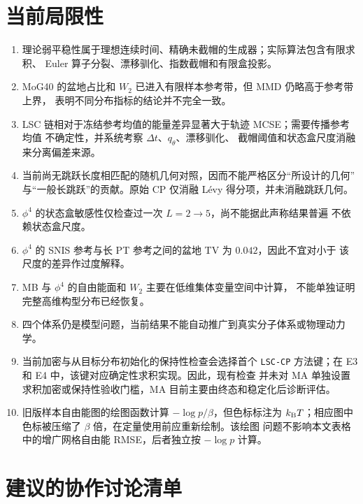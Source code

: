\documentclass[11pt,a4paper]{article}
\begin{document}
\section{当前局限性}

\begin{enumerate}
 \item 理论弱平稳性属于理想连续时间、精确未截帽的生成器；实际算法包含有限求积、
 Euler 算子分裂、漂移驯化、指数截帽和有限盒投影。
 \item MoG40 的盆地占比和 $W_2$ 已进入有限样本参考带，但 MMD 仍略高于参考带上界，
 表明不同分布指标的结论并不完全一致。
 \item LSC 链相对于冻结参考均值的能量差异显著大于轨迹 MCSE；需要传播参考均值
 不确定性，并系统考察 $\Delta t$、$q_\theta$、漂移驯化、
 截帽阈值和状态盒尺度消融来分离偏差来源。
 \item 当前尚无跳跃长度相匹配的随机几何对照，因而不能严格区分“所设计的几何”
 与“一般长跳跃”的贡献。原始 CP 仅消融 Lévy 得分项，并未消融跳跃几何。
 \item $\phi^4$ 的状态盒敏感性仅检查过一次 $L=2\to5$，尚不能据此声称结果普遍
 不依赖状态盒尺度。
 \item $\phi^4$ 的 SNIS 参考与长 PT 参考之间的盆地 TV 为 $0.042$，因此不宜对小于
 该尺度的差异作过度解释。
 \item MB 与 $\phi^4$ 的自由能面和 $W_2$ 主要在低维集体变量空间中计算，
 不能单独证明完整高维构型分布已经恢复。
 \item 四个体系仍是模型问题，当前结果不能自动推广到真实分子体系或物理动力学。
 \item 当前加密与从目标分布初始化的保持性检查会选择首个
 \texttt{LSC-CP} 方法键；在 E3 和 E4 中，该键对应确定性求积实现。因此，现有检查
 并未对 MA 单独设置求积加密或保持性验收门槛，MA 目前主要由终态和稳定化后诊断评估。
 \item 旧版样本自由能图的绘图函数计算 $-\log p/\beta$，但色标标注为
 $k_{\rm B}T$；相应图中色标被压缩了 $\beta$ 倍，在定量使用前应重新绘制。该绘图
 问题不影响本文表格中的增广网格自由能 RMSE，后者独立按 $-\log p$ 计算。
\end{enumerate}

\section{建议的协作讨论清单}
\end{document}
